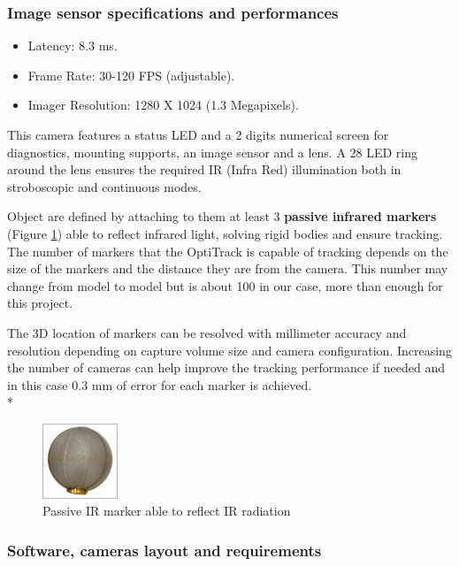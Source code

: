 \subsubsection{Image sensor specifications and performances}
\begin{itemize}
\item Latency: 8.3 ms.
\item Frame Rate: 30-120 FPS (adjustable).
\item Imager Resolution: 1280 X 1024 (1.3 Megapixels).
\end{itemize}
\noindent
This camera features a status LED and a 2 digits numerical screen for diagnostics, mounting supports, an image sensor and a lens. A 28 LED ring around the lens ensures the required IR (Infra Red) illumination both in stroboscopic and continuous modes.

Object are defined by attaching to them at least 3 \textbf {passive infrared markers} (Figure \ref{figure:marker}) able to reflect infrared light, solving rigid bodies and ensure tracking. The number of markers that the OptiTrack is capable of tracking depends on the size of the markers and the distance they are from the camera. This number may change from model to model but is about 100 in our case, more than enough for this project.\par The 3D location of markers can be resolved with millimeter accuracy and resolution depending on capture volume size and camera configuration. Increasing the number of cameras can help improve the tracking performance if needed and in this case 0.3 mm of error for each marker is achieved. \\* 

\begin{figure}[h]
\centering
 \includegraphics[width=0.2\textwidth]{marker.jpg}
 \caption[Passive IR marker]{Passive IR marker able to reflect IR radiation}
 \label{figure:marker}
\end{figure}


\subsubsection{Software, cameras layout and requirements} 

